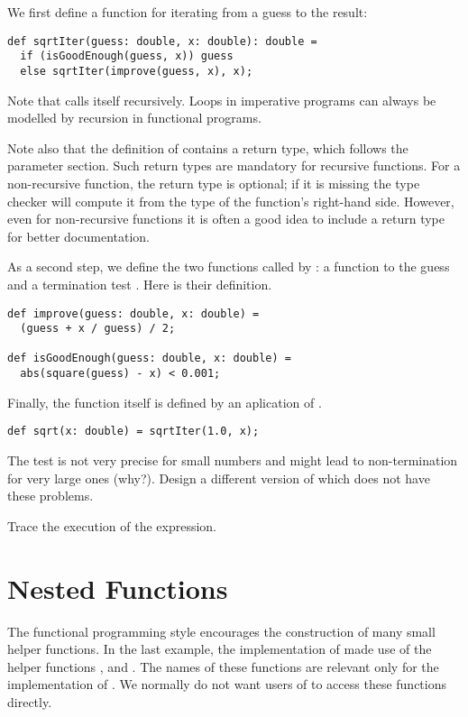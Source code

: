We first define a function for iterating from a guess to the result:
\begin{lstlisting}
def sqrtIter(guess: double, x: double): double = 
  if (isGoodEnough(guess, x)) guess
  else sqrtIter(improve(guess, x), x);
\end{lstlisting}
Note that  calls itself recursively.  Loops in
imperative programs can always be modelled by recursion in functional
programs. 

Note also that the definition of  contains a return
type, which follows the parameter section. Such return types are
mandatory for recursive functions. For a non-recursive function, the
return type is optional; if it is missing the type checker will
compute it from the type of the function's right-hand side. However,
even for non-recursive functions it is often a good idea to include a
return type for better documentation.

As a second step, we define the two functions called by
: a function to  the guess and a
termination test . Here is their definition.
\begin{lstlisting}
def improve(guess: double, x: double) = 
  (guess + x / guess) / 2;

def isGoodEnough(guess: double, x: double) = 
  abs(square(guess) - x) < 0.001;
\end{lstlisting}

Finally, the  function itself is defined by an aplication
of .
\begin{lstlisting}
def sqrt(x: double) = sqrtIter(1.0, x);
\end{lstlisting}

\begin{exercise} The  test is not very precise for small
numbers and might lead to non-termination for very large ones (why?).
Design a different version of  which does not have
these problems.
\end{exercise}

\begin{exercise} Trace the execution of the  expression.
\end{exercise}

\section{Nested Functions}

The functional programming style encourages the construction of many
small helper functions. In the last example, the implementation
of  made use of the helper functions ,
 and . The names of these functions
are relevant only for the implementation of . We normally
do not want users of  to access these functions directly.

